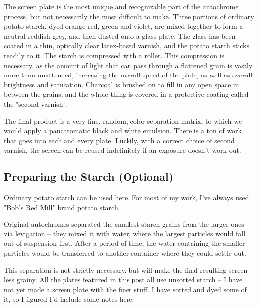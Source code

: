 \documentclass[11pt]{article}
\begin{document}
The screen plate is the most unique and recognizable part of the autochrome process, but not necessarily the most difficult to make. Three portions of ordinary potato starch, dyed orange-red, green and violet, are mixed together to form a neutral reddish-grey, and then dusted onto a glass plate. The glass has been coated in a thin, optically clear latex-based varnish, and the potato starch sticks readily to it. The starch is compressed with a roller. This compression is necessary, as the amount of light that can pass through a flattened grain is vastly more than unattended, increasing the overall speed of the plate, as well as overall brightness and saturation. Charcoal is brushed on to fill in any open space in between the grains, and the whole thing is covered in a protective coating called the "second varnish".\newline

The final product is a very fine, random, color separation matrix, to which we would apply a panchromatic black and white emulsion. There is a ton of work that goes into each and every plate. Luckily, with a correct choice of second varnish, the screen can be reused indefinitely if an exposure doesn't work out.\newline

\subsection{Preparing the Starch (Optional)}

Ordinary potato starch can be used here. For most of my work, I've always used "Bob's Red Mill" brand potato starch.\newline

Original autochromes separated the smallest starch grains from the larger ones via levigation -- they mixed it with water, where the largest particles would fall out of suspension first. After a period of time, the water containing the smaller particles would be transferred to another container where they could settle out.\newline 

This separation is not strictly necessary, but will make the final resulting screen less grainy. All the plates featured in this post all use unsorted starch -- I have not yet made a screen plate with the finer stuff. I have sorted and dyed some of it, so I figured I'd include some notes here.\newline
\end{document}

